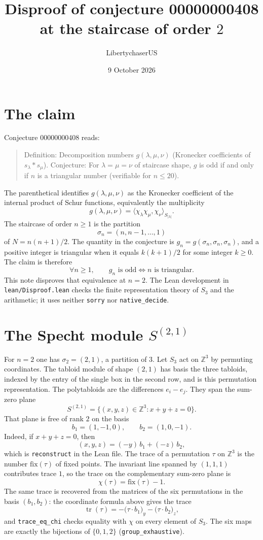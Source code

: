 \documentclass[11pt]{article}
\title{Disproof of conjecture 00000000408\\
at the staircase of order \(2\)}
\author{LibertychaserUS}
\date{9 October 2026}
\begin{document}
\maketitle

\section{The claim}
Conjecture 00000000408 reads:
\begin{quote}
Definition: Decomposition numbers \(g(\lambda,\mu,\nu)\) (Kronecker coefficients of \(s_\lambda * s_\mu\)).
Conjecture: For \(\lambda=\mu=\nu\) of staircase shape, \(g\) is odd if and only if \(n\) is a triangular number (verifiable for \(n\le 20\)).
\end{quote}
The parenthetical identifies \(g(\lambda,\mu,\nu)\) as the Kronecker coefficient of the internal product of Schur functions, equivalently the multiplicity
\[
g(\lambda,\mu,\nu)=\langle \chi_\lambda\chi_\mu,\chi_\nu\rangle_{S_{|\lambda|}}.
\]
The staircase of order \(n\ge 1\) is the partition
\[
\sigma_n=(n,n-1,\ldots,1)
\]
of \(N=n(n+1)/2\). The quantity in the conjecture is \(g_n=g(\sigma_n,\sigma_n,\sigma_n)\), and a positive integer is triangular when it equals \(k(k+1)/2\) for some integer \(k\ge 0\). The claim is therefore
\[
\forall n\ge 1,\qquad g_n\text{ is odd}\iff n\text{ is triangular}.
\]
This note disproves that equivalence at \(n=2\). The Lean development in \texttt{lean/Disproof.lean} checks the finite representation theory of \(S_3\) and the arithmetic; it uses neither \texttt{sorry} nor \texttt{native\_decide}.

\section{The Specht module \(S^{(2,1)}\)}
For \(n=2\) one has \(\sigma_2=(2,1)\), a partition of \(3\). Let \(S_3\) act on \(\mathbb{Z}^3\) by permuting coordinates. The tabloid module of shape \((2,1)\) has basis the three tabloids, indexed by the entry of the single box in the second row, and is this permutation representation. The polytabloids are the differences \(e_i-e_j\). They span the sum-zero plane
\[
S^{(2,1)}=\{(x,y,z)\in\mathbb{Z}^3:x+y+z=0\}.
\]
That plane is free of rank \(2\) on the basis
\[
b_1=(1,-1,0),\qquad b_2=(1,0,-1).
\]
Indeed, if \(x+y+z=0\), then
\[
(x,y,z)=(-y)\,b_1+(-z)\,b_2,
\]
which is \texttt{reconstruct} in the Lean file. The trace of a permutation \(\tau\) on \(\mathbb{Z}^3\) is the number \(\mathrm{fix}(\tau)\) of fixed points. The invariant line spanned by \((1,1,1)\) contributes trace \(1\), so the trace on the complementary sum-zero plane is
\[
\chi(\tau)=\mathrm{fix}(\tau)-1.
\]
The same trace is recovered from the matrices of the six permutations in the basis \((b_1,b_2)\): the coordinate formula above gives the trace
\[
\operatorname{tr}(\tau)=-\bigl(\tau\cdot b_1\bigr)_y-\bigl(\tau\cdot b_2\bigr)_z,
\]
and \texttt{trace\_eq\_chi} checks equality with \(\chi\) on every element of \(S_3\). The six maps are exactly the bijections of \(\{0,1,2\}\) (\texttt{group\_exhaustive}).
\end{document}
